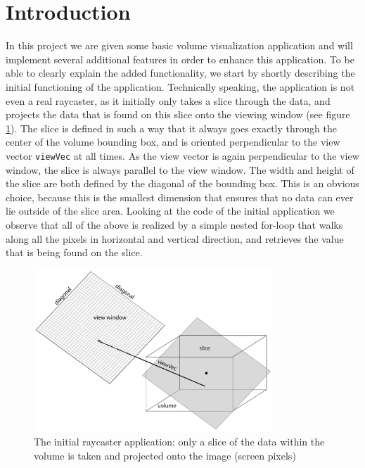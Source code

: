 \section{Introduction}\label{sec:intro}
In this project we are given some basic volume visualization application and will implement several additional features in order to enhance this application. To be able to clearly explain the added functionality, we start by shortly describing the initial functioning of the application. Technically speaking, the application is not even a real raycaster, as it initially only takes a slice through the data, and projects the data that is found on this slice onto the viewing window (see figure \ref{fig:raycaster0}). The slice is defined in such a way that it always goes exactly through the center of the volume bounding box, and is oriented perpendicular to the view vector \texttt{viewVec} at all times. As the view vector is again perpendicular to the view window, the slice is always parallel to the view window. The width and height of the slice are both defined by the diagonal of the bounding box. This is an obvious choice, because this is the smallest dimension that ensures that no data can ever lie outside of the slice area. Looking at the code of the initial application we observe that all of the above is realized by a simple nested for-loop that walks along all the pixels in horizontal and vertical direction, and retrieves the value that is being found on the slice.

\begin{figure}[h!]
    \centering
    \captionsetup{justification=centering,margin=0.5cm}
    \includegraphics[width=0.8\textwidth]{img/raycaster0.pdf}
    \caption{The initial raycaster application: only a slice of the data within the volume is taken and projected onto the image (screen pixels)}
    \label{fig:raycaster0}
\end{figure}


